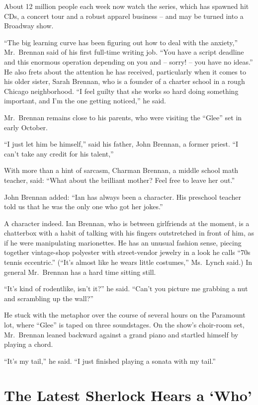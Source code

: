 ﻿\documentclass[12pt]{article}
\begin{document}
About 12 million people each week now watch the series, which has spawned hit CDs, a concert tour
and a robust apparel business -- and may be turned into a Broadway show.

``The big learning curve has been figuring out how to deal with the anxiety,'' Mr.~Brennan said of
his first full-time writing job. ``You have a script deadline and this enormous operation depending
on you and -- sorry! -- you have no ideas.'' He also frets about the attention he has received,
particularly when it comes to his older sister, Sarah Brennan, who is a founder of a charter school
in a rough Chicago neighborhood. ``I feel guilty that she works so hard doing something important,
and I'm the one getting noticed,'' he said.

Mr.~Brennan remains close to his parents, who were visiting the ``Glee'' set in early October.

``I just let him be himself,'' said his father, John Brennan, a former priest. ``I can't take any
credit for his talent,''

With more than a hint of sarcasm, Charman Brennan, a middle school math teacher, said: ``What about
the brilliant mother? Feel free to leave her out.''

John Brennan added: ``Ian has always been a character. His preschool teacher told us that he was the
only one who got her jokes.''

A character indeed. Ian Brennan, who is between girlfriends at the moment, is a chatterbox with a
habit of talking with his fingers outstretched in front of him, as if he were manipulating
marionettes. He has an unusual fashion sense, piecing together vintage-shop polyester with
street-vendor jewelry in a look he calls ``70s tennis eccentric.'' (``It's almost like he wears
little costumes,'' Ms.~Lynch said.) In general Mr.~Brennan has a hard time sitting still.

``It's kind of rodentlike, isn't it?'' he said. ``Can't you picture me grabbing a nut and scrambling
up the wall?''

He stuck with the metaphor over the course of several hours on the Paramount lot, where ``Glee'' is
taped on three soundstages. On the show's choir-room set, Mr.~Brennan leaned backward against a
grand piano and startled himself by playing a chord.

``It's my tail,'' he said. ``I just finished playing a sonata with my tail.''

\section{The Latest Sherlock Hears a `Who'}
\end{document}

